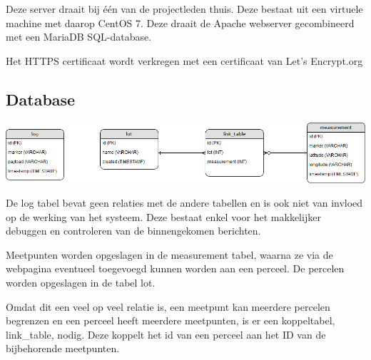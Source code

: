 Deze server draait bij één van de projectleden thuis. Deze bestaat uit een virtuele
machine met daarop CentOS 7. Deze draait de Apache webserver gecombineerd met een
MariaDB SQL-database.

Het HTTPS certificaat wordt verkregen met een certificaat van Let's Encrypt.org

\subsection{Database}
\label{sec:database}
\includegraphics[width=\textwidth]{technical/erd.png}

De log tabel bevat geen relaties met de andere tabellen en is ook niet van
invloed op de werking van het systeem. Deze bestaat enkel voor het makkelijker
debuggen en controleren van de binnengekomen berichten.

Meetpunten worden opgeslagen in de measurement tabel, waarna ze via de webpagina
eventueel toegevoegd kunnen worden aan een perceel. De percelen worden opgeslagen
in de tabel lot.

Omdat dit een veel op veel relatie is, een meetpunt kan meerdere percelen begrenzen en
een perceel heeft meerdere meetpunten, is er een koppeltabel, link\_table, nodig.
Deze koppelt het id van een perceel aan het ID van de bijbehorende meetpunten.
